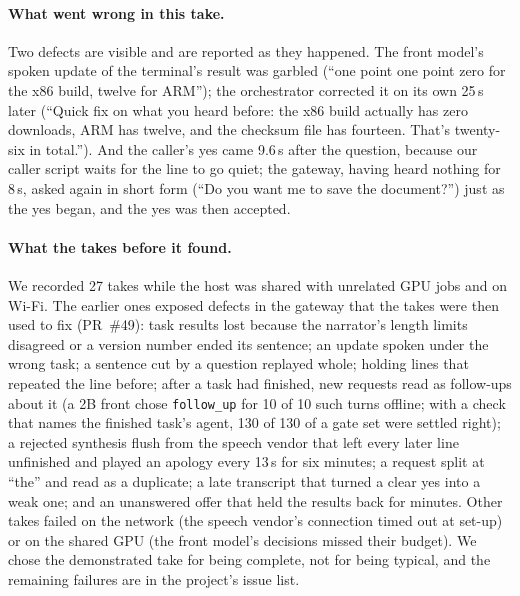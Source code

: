 \paragraph{What went wrong in this take.} Two defects are visible and are reported as they happened. The front
model's spoken update of the terminal's result was garbled (``one point one point zero for the x86 build, twelve for
ARM''); the orchestrator corrected it on its own 25\,s later (``Quick fix on what you heard before: the x86 build
actually has zero downloads, ARM has twelve, and the checksum file has fourteen. That's twenty-six in total.''). And
the caller's yes came 9.6\,s after the question, because our caller script waits for the line to go quiet; the
gateway, having heard nothing for 8\,s, asked again in short form (``Do you want me to save the document?'') just
as the yes began, and the yes was then accepted.

\paragraph{What the takes before it found.} We recorded 27 takes while the host was shared with unrelated GPU jobs
and on Wi-Fi. The earlier ones exposed defects in the gateway that the takes were then used to fix (PR~\#49): task
results lost because the narrator's length limits disagreed or a version number ended its sentence; an update
spoken under the wrong task; a sentence cut by a question replayed whole; holding lines that repeated the line
before; after a task had finished, new requests read as follow-ups about it (a 2B front chose \texttt{follow\_up}
for 10 of 10 such turns offline; with a check that names the finished task's agent, 130 of 130 of a gate set were
settled right); a rejected synthesis flush from the speech vendor that left every later line unfinished and played
an apology every 13\,s for six minutes; a request split at ``the'' and read as a duplicate; a late transcript that
turned a clear yes into a weak one; and an unanswered offer that held the results back for minutes. Other takes
failed on the network (the speech vendor's connection timed out at set-up) or on the shared GPU (the front model's
decisions missed their budget). We chose the demonstrated take for being complete, not for being typical, and the
remaining failures are in the project's issue list.
